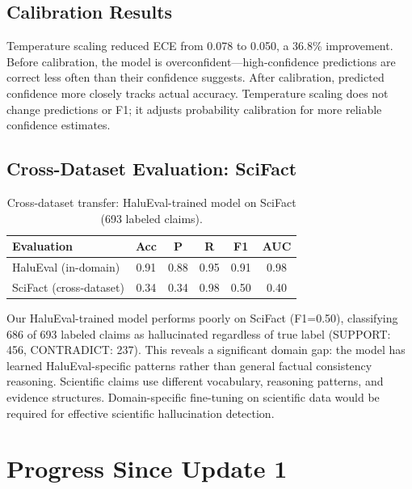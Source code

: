 \documentclass[11pt]{article}
\begin{document}
\subsection{Calibration Results}

Temperature scaling reduced ECE from 0.078 to 0.050, a 36.8\% improvement. Before calibration, the model is overconfident---high-confidence predictions are correct less often than their confidence suggests. After calibration, predicted confidence more closely tracks actual accuracy. Temperature scaling does not change predictions or F1; it adjusts probability calibration for more reliable confidence estimates.

\subsection{Cross-Dataset Evaluation: SciFact}

\begin{table}[h]
\centering
\small
\begin{tabular}{lccccc}
\toprule
\textbf{Evaluation} & \textbf{Acc} & \textbf{P} & \textbf{R} & \textbf{F1} & \textbf{AUC} \\
\midrule
HaluEval (in-domain) & 0.91 & 0.88 & 0.95 & 0.91 & 0.98 \\
SciFact (cross-dataset) & 0.34 & 0.34 & 0.98 & 0.50 & 0.40 \\
\bottomrule
\end{tabular}
\caption{Cross-dataset transfer: HaluEval-trained model on SciFact (693 labeled claims).}
\label{tab:scifact}
\end{table}

Our HaluEval-trained model performs poorly on SciFact (F1=0.50), classifying 686 of 693 labeled claims as hallucinated regardless of true label (SUPPORT: 456, CONTRADICT: 237). This reveals a significant domain gap: the model has learned HaluEval-specific patterns rather than general factual consistency reasoning. Scientific claims use different vocabulary, reasoning patterns, and evidence structures. Domain-specific fine-tuning on scientific data would be required for effective scientific hallucination detection.

\section{Progress Since Update 1}
\end{document}
